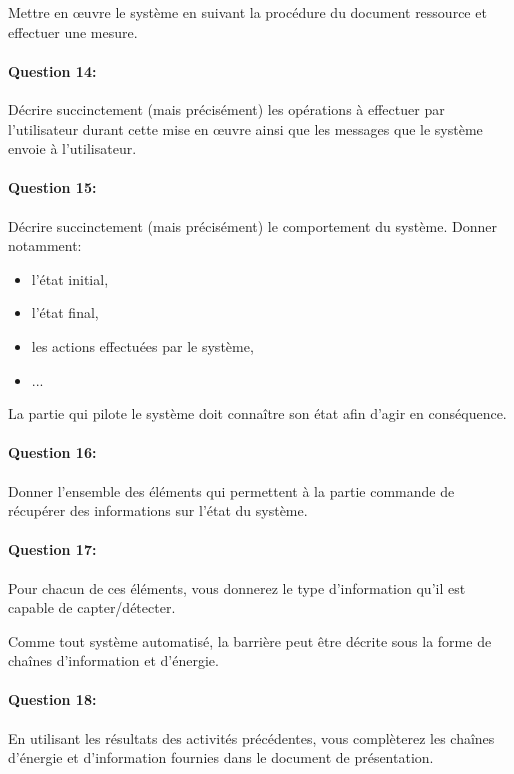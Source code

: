 
Mettre en \oe uvre le système en suivant la procédure du document ressource et effectuer une mesure.

\paragraph{Question 14:} Décrire succinctement (mais précisément) les opérations à effectuer par l'utilisateur durant cette mise en \oe uvre ainsi que les messages que le système envoie à l'utilisateur.

\paragraph{Question 15:} Décrire succinctement (mais précisément) le comportement du système. Donner notamment:
\begin{itemize}
 \item l'état initial,
 \item l'état final,
 \item les actions effectuées par le système,
 \item ...
\end{itemize}


La partie qui pilote le système doit connaître son état afin d'agir en conséquence. 

\paragraph{Question 16:} Donner l'ensemble des éléments qui permettent à la partie commande de récupérer des informations sur l'état du système.

\paragraph{Question 17:} Pour chacun de ces éléments, vous donnerez le type d'information qu'il est capable de capter/détecter.


Comme tout système automatisé, la barrière peut être décrite sous la forme de chaînes d'information et d'énergie.

\paragraph{Question 18:} En utilisant les résultats des activités précédentes, vous complèterez les chaînes d'énergie et d'information fournies dans le document de présentation.

